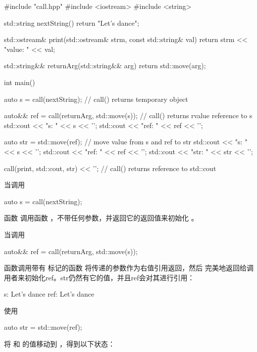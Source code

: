 \begin{cppcode}
#include "call.hpp"
#include <iostream>
#include <string>

std::string nextString()
{
	return "Let's dance";
}

std::ostream& print(std::ostream& strm, const std::string& val)
{
	return strm << "value: " << val;
}

std::string&& returnArg(std::string&& arg)
{
	return std::move(arg);
}

int main()
{
	auto s = call(nextString); // call() returns temporary object

	auto&& ref = call(returnArg, std::move(s)); // call() returns rvalue reference to s
	std::cout << "s: " << s << '\n';
	std::cout << "ref: " << ref << '\n';

	auto str = std::move(ref); // move value from s and ref to str
	std::cout << "s: " << s << '\n';
	std::cout << "ref: " << ref << '\n';
	std::cout << "str: " << str << '\n';

	call(print, std::cout, str) << '\n'; // call() returns reference to std::cout
}
\end{cppcode}

当调用

\begin{cppcode}
auto s = call(nextString);
\end{cppcode}

函数  调用函数 ，不带任何参数，并返回它的返回值来初始化 。

当调用

\begin{cppcode}
auto&& ref = call(returnArg, std::move(s));
\end{cppcode}

函数调用带有  标记的函数  将传递的参数作为右值引用返回，然后  完美地返回给调用者来初始化ref。str仍然有它的值，并且ref会对其进行引用：

\begin{outputcode}
s: Let's dance
ref: Let's dance
\end{outputcode}

使用

\begin{cppcode}
auto str = std::move(ref);
\end{cppcode}

将  和  的值移动到 ，得到以下状态：


